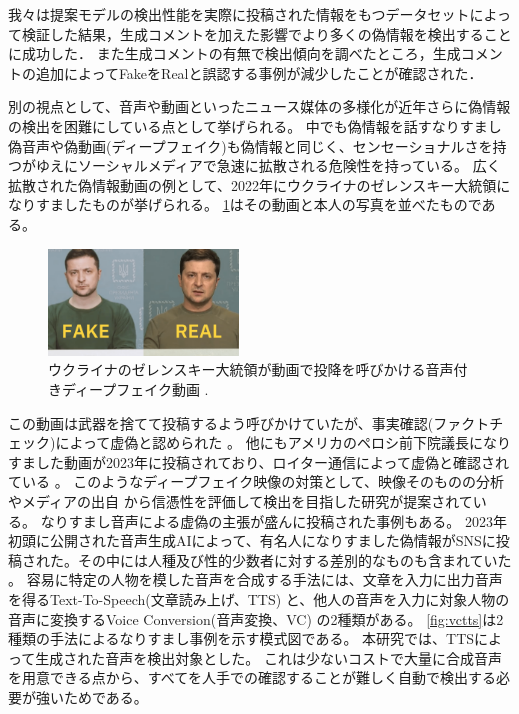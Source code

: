 我々は提案モデルの検出性能を実際に投稿された情報をもつデータセットによって検証した結果，生成コメントを加えた影響でより多くの偽情報を検出することに成功した．
また生成コメントの有無で検出傾向を調べたところ，生成コメントの追加によってFakeをRealと誤認する事例が減少したことが確認された．

別の視点として、音声や動画といったニュース媒体の多様化が近年さらに偽情報の検出を困難にしている点として挙げられる。
中でも偽情報を話すなりすまし偽音声や偽動画(ディープフェイク)も偽情報と同じく、センセーショナルさを持つがゆえにソーシャルメディアで急速に拡散される危険性を持っている。
広く拡散された偽情報動画の例として、2022年にウクライナのゼレンスキー大統領になりすましたものが挙げられる。
\cref{fig:zelensky}はその動画と本人の写真を並べたものである。
\begin{figure}  %
    \centering
    \includegraphics[width=0.45\textwidth]{figures/zelensky.png}
    \caption{ウクライナのゼレンスキー大統領が動画で投降を呼びかける音声付きディープフェイク動画 \cite{evon_2022}.}
    \label{fig:zelensky}
\end{figure}
この動画は武器を捨てて投稿するよう呼びかけていたが、事実確認(ファクトチェック)によって虚偽と認められた \cite{Staff_2020}。
他にもアメリカのペロシ前下院議長になりすました動画が2023年に投稿されており、ロイター通信によって虚偽と確認されている \cite{Check_2023}。
このようなディープフェイク映像の対策として、映像そのものの分析 \cite{8683164}やメディアの出自 \cite{8668407}から信憑性を評価して検出を目指した研究が提案されている。
なりすまし音声による虚偽の主張が盛んに投稿された事例もある。
2023年初頭に公開された音声生成AIによって、有名人になりすました偽情報がSNSに投稿された。その中には人種及び性的少数者に対する差別的なものも含まれていた \cite{cox_2023}。
容易に特定の人物を模した音声を合成する手法には、文章を入力に出力音声を得るText-To-Speech(文章読み上げ、TTS) \cite{klatt1987review}と、他人の音声を入力に対象人物の音声に変換するVoice Conversion(音声変換、VC) \cite{661472}の2種類がある。
\cref{fig:vctts}は2種類の手法によるなりすまし事例を示す模式図である。
本研究では、TTSによって生成された音声を検出対象とした。
これは少ないコストで大量に合成音声を用意できる点から、すべてを人手での確認することが難しく自動で検出する必要が強いためである。
